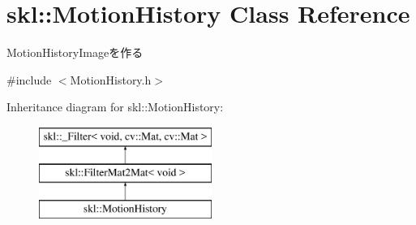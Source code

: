 \hypertarget{classskl_1_1_motion_history}{}\section{skl\+:\+:Motion\+History Class Reference}
\label{classskl_1_1_motion_history}


Motion\+History\+Imageを作る  




{\ttfamily \#include $<$Motion\+History.\+h$>$}

Inheritance diagram for skl\+:\+:Motion\+History\+:\begin{figure}[H]
\begin{center}
\leavevmode
\includegraphics[height=3.000000cm]{classskl_1_1_motion_history}
\end{center}
\end{figure}
